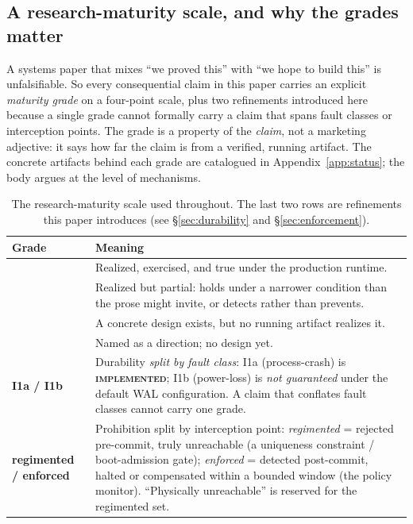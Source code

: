 \documentclass[11pt,a4paper]{article}
\newcommand{\Built}{{\textcolor{hhink}{\textsc{\textbf{implemented}}}}}
\newcommand{\BuiltWeak}{{\textcolor{hhink}{\textsc{partial}}}}
\newcommand{\Designed}{{\textcolor{hhgray}{\textsc{specified}}}}
\newcommand{\Vision}{{\textcolor{hhgray}{\textit{proposed}}}}
\newcommand{\NotGuar}{{\textcolor{hhink}{\textit{not guaranteed}}}}
\theoremstyle{definition}
\theoremstyle{remark}
\begin{document}
\subsection{A research-maturity scale, and why the grades matter}
\label{sec:honestkey}

A systems paper that mixes ``we proved this'' with ``we hope to build this'' is
unfalsifiable. So every consequential claim in this paper carries an explicit
\emph{maturity grade} on a four-point scale, plus two refinements introduced here
because a single grade cannot formally carry a claim that spans fault classes or
interception points. The grade is a property of the \emph{claim}, not a marketing
adjective: it says how far the claim is from a verified, running artifact. The
concrete artifacts behind each grade are catalogued in
Appendix~\ref{app:status}; the body argues at the level of mechanisms.

\begin{table}[H]
\centering
\caption{The research-maturity scale used throughout. The last two rows are
refinements this paper introduces (see \S\ref{sec:durability} and
\S\ref{sec:enforcement}).}
\label{tab:honestkey}
\small
\renewcommand{\arraystretch}{1.25}
\begin{tabularx}{\textwidth}{@{}>{\raggedright\arraybackslash}p{} >{\raggedright\arraybackslash}X@{}}
\toprule
\textbf{Grade} & \textbf{Meaning} \\
\midrule
\Built & Realized, exercised, and true under the production runtime. \\
\BuiltWeak & Realized but partial: holds under a narrower condition than the prose might invite, or detects rather than prevents. \\
\Designed & A concrete design exists, but no running artifact realizes it. \\
\Vision & Named as a direction; no design yet. \\
\midrule
\textbf{I1a / I1b} & Durability \emph{split by fault class}: I1a (process-crash) is \Built; I1b (power-loss) is \NotGuar{} under the default WAL configuration. A claim that conflates fault classes cannot carry one grade. \\
\textbf{regimented / enforced} & Prohibition split by interception point: \emph{regimented} = rejected pre-commit, truly unreachable (a uniqueness constraint / boot-admission gate); \emph{enforced} = detected post-commit, halted or compensated within a bounded window (the policy monitor). ``Physically unreachable'' is reserved for the regimented set. \\
\bottomrule
\end{tabularx}
\end{table}
\end{document}
